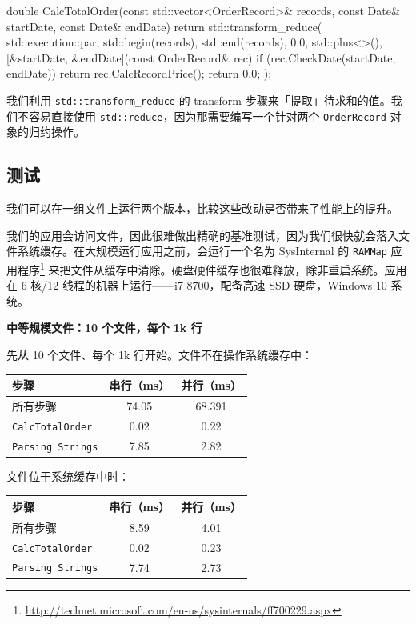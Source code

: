 \begin{codebox}[cpp]
double CalcTotalOrder(const std::vector<OrderRecord>& records,
const Date& startDate, const Date& endDate)
{
return std::transform_reduce(
std::execution::par,
std::begin(records), std::end(records),
0.0,
std::plus<>(),
[&startDate, &endDate](const OrderRecord& rec) {
if (rec.CheckDate(startDate, endDate))
return rec.CalcRecordPrice();
return 0.0;
}
);
}
\end{codebox}

我们利用 \texttt{std::transform\_reduce} 的 transform 步骤来「提取」待求和的值。我们不容易直接使用 \texttt{std::reduce}，因为那需要编写一个针对两个 \texttt{OrderRecord} 对象的归约操作。

\subsection{测试}

我们可以在一组文件上运行两个版本，比较这些改动是否带来了性能上的提升。

我们的应用会访问文件，因此很难做出精确的基准测试，因为我们很快就会落入文件系统缓存。在大规模运行应用之前，会运行一个名为 SysInternal 的 \texttt{RAMMap} 应用程序\footnote{\url{http://technet.microsoft.com/en-us/sysinternals/ff700229.aspx}} 来把文件从缓存中清除。硬盘硬件缓存也很难释放，除非重启系统。应用在 6 核/12 线程的机器上运行——i7 8700，配备高速 SSD 硬盘，Windows 10 系统。

\textbf{中等规模文件：10 个文件，每个 1k 行}

先从 10 个文件、每个 1k 行开始。文件不在操作系统缓存中：

\begin{table}[H]
\centering
\begin{tabularx}{\textwidth}{X c c}
\toprule
步骤 & 串行（ms） & 并行（ms） \\
\midrule
所有步骤 & 74.05 & 68.391 \\
\texttt{CalcTotalOrder} & 0.02 & 0.22 \\
\texttt{Parsing Strings} & 7.85 & 2.82 \\
\bottomrule
\end{tabularx}
\end{table}

文件位于系统缓存中时：

\begin{table}[H]
\centering
\begin{tabularx}{\textwidth}{X c c}
\toprule
步骤 & 串行（ms） & 并行（ms） \\
\midrule
所有步骤 & 8.59 & 4.01 \\
\texttt{CalcTotalOrder} & 0.02 & 0.23 \\
\texttt{Parsing Strings} & 7.74 & 2.73 \\
\bottomrule
\end{tabularx}
\end{table}

